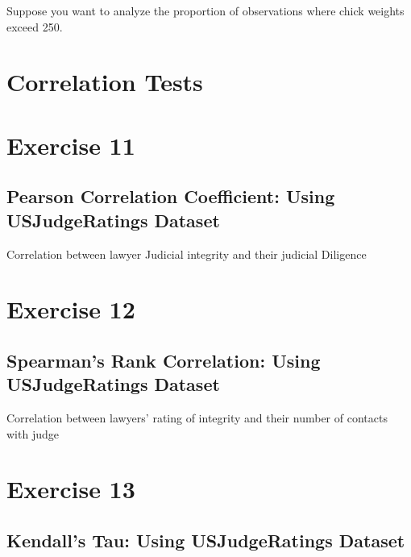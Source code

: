 \documentclass[
]{book}
\begin{document}
Suppose you want to analyze the proportion of observations where chick weights exceed 250.

\section*{Correlation Tests}\label{correlation-tests}

\section*{Exercise 11}\label{exercise-11}

\subsection{Pearson Correlation Coefficient: Using USJudgeRatings Dataset}\label{pearson-correlation-coefficient-using-usjudgeratings-dataset}

Correlation between lawyer Judicial integrity and their judicial Diligence

\section*{Exercise 12}\label{exercise-12}

\subsection{Spearman's Rank Correlation: Using USJudgeRatings Dataset}\label{spearmans-rank-correlation-using-usjudgeratings-dataset}

Correlation between lawyers' rating of integrity and their number of contacts with judge

\section*{Exercise 13}\label{exercise-13}

\subsection*{Kendall's Tau: Using USJudgeRatings Dataset}\label{kendalls-tau-using-usjudgeratings-dataset}
\end{document}
